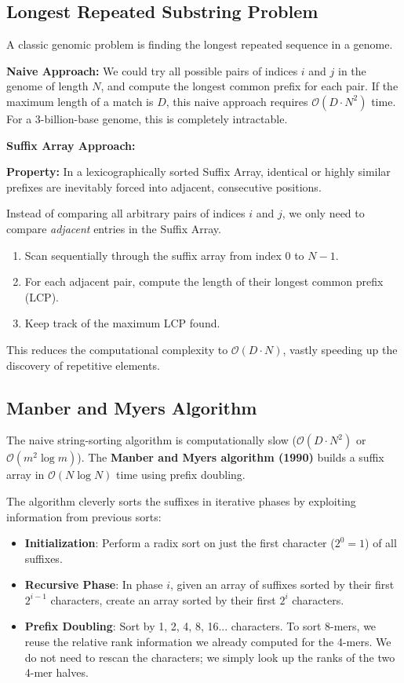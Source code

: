 \subsection{Longest Repeated Substring Problem}

A classic genomic problem is finding the longest repeated sequence in a genome.

\textbf{Naive Approach:}
We could try all possible pairs of indices $i$ and $j$ in the genome of length $N$, and compute the longest common prefix for each pair. If the maximum length of a match is $D$, this naive approach requires \(\mathcal{O}(D \cdot N^2)\) time. For a 3-billion-base genome, this is completely intractable.

\textbf{Suffix Array Approach:}
\begin{important}
    \textbf{Property:} In a lexicographically sorted Suffix Array, identical or highly similar prefixes are inevitably forced into adjacent, consecutive positions.
\end{important}

Instead of comparing all arbitrary pairs of indices $i$ and $j$, we only need to compare \textit{adjacent} entries in the Suffix Array.
\begin{enumerate}
    \item Scan sequentially through the suffix array from index $0$ to $N-1$.
    \item For each adjacent pair, compute the length of their longest common prefix (LCP).
    \item Keep track of the maximum LCP found.
\end{enumerate}
This reduces the computational complexity to \(\mathcal{O}(D \cdot N)\), vastly speeding up the discovery of repetitive elements.

\subsection{Manber and Myers Algorithm}

The naive string-sorting algorithm is computationally slow (\(\mathcal{O}(D \cdot N^2)\) or \(\mathcal{O}(m^2 \log m)\)). The \textbf{Manber and Myers algorithm (1990)} builds a suffix array in \(\mathcal{O}(N \log N)\) time using prefix doubling.

The algorithm cleverly sorts the suffixes in iterative phases by exploiting information from previous sorts:
\begin{itemize}
    \item \textbf{Initialization}: Perform a radix sort on just the first character (\(2^0 = 1\)) of all suffixes.
    \item \textbf{Recursive Phase}: In phase $i$, given an array of suffixes sorted by their first \(2^{i-1}\) characters, create an array sorted by their first \(2^i\) characters.
    \item \textbf{Prefix Doubling}: Sort by 1, 2, 4, 8, 16... characters. To sort 8-mers, we reuse the relative rank information we already computed for the 4-mers. We do not need to rescan the characters; we simply look up the ranks of the two 4-mer halves.
\end{itemize}

